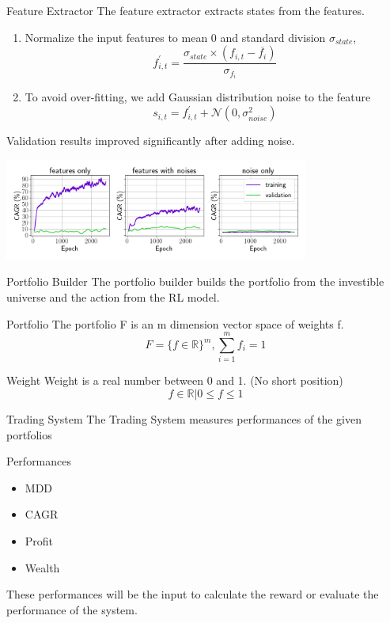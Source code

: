 \begin{frame}{Feature Extractor}
The feature extractor extracts states from the features.
\begin{enumerate}
    \item {
    Normalize the input features to mean 0 and standard division \(\sigma_{state}\),
        \[
            f^{'}_{i,t} = \frac{\sigma_{state} \times   (f_{i,t} -  \overline{f_i})}{\sigma_{f_i}}
        \]
    }
    \item{To avoid over-fitting, we add Gaussian distribution noise to the feature
            \[
            s_{i,t} = f^{'}_{i,t} + \mathcal{N}(0,\sigma_{noise}^2)
        \]
    }
\end{enumerate}
\alert{Validation results improved significantly after adding noise.}
\begin{center}
  \includegraphics[width=10cm]{images/compare_noise.png}
\end{center}
\end{frame}

\begin{frame}{Portfolio Builder}
The portfolio builder builds the portfolio from the investible universe and the action from the RL model.
\\
\begin{block}{Portfolio}
The portfolio F is an m dimension vector space of weights f.
\[
    F = \{ {f \in \mathbb{R} } \} ^m,
    \sum_{i=1}^m {f_i} =1
\]
\end{block}
\begin{block}{Weight}
Weight is a real number between 0 and 1. \alert{(No short position)}
\[
    f \in \mathbb{R} | 0 \leq f \leq 1 
\]
\end{block}
\end{frame}


\begin{frame}{Trading System}
The Trading System measures performances of the given portfolios
\begin{block}{Performances}
\begin{itemize}
    \item MDD
    \item CAGR
    \item Profit
    \item Wealth
\end{itemize}
\end{block}
These performances will be the input to calculate the reward or evaluate the performance of the system. 
\end{frame}


